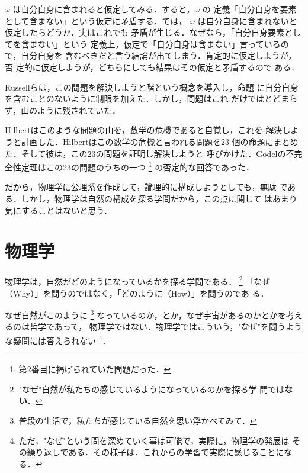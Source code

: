             $\omega$ は自分自身に含まれると仮定してみる．すると，$\omega$ の
            定義「自分自身を要素として含まない」という仮定に矛盾する．では，
            $\omega$ は自分自身に含まれないと仮定したらどうか．実はこれでも
            矛盾が生じる．なぜなら，「自分自身要素としてを含まない」という
            定義上，仮定で「自分自身は含まない」言っているので，自分自身を
            含むべきだと言う結論が出てしまう．肯定的に仮定しようが，否
            定的に仮定しようが，どちらにしても結果はその仮定と矛盾するので
            ある．

            Russellらは，この問題を解決しようと階という概念を導入し，命題
            に自分自身を含むことのないように制限を加えた．しかし，問題はこれ
            だけではとどまらず，山のように残されていた．

            Hilbertはこのような問題の山を，数学の危機であると自覚し，これを
            解決しようと計画した．Hilbertはこの数学の危機と言われる問題を23
            個の命題にまとめた．そして彼は，この23の問題を証明し解決しようと
            呼びかけた．G\"{o}delの不完全性定理はこの23の問題のうちの一つ
                \footnote{
                    第2番目に掲げられていた問題だった．
                }
            の否定的な回答であった．

            だから，物理学に公理系を作成して，論理的に構成しようとしても，無駄
            である．しかし，物理学は自然の構成を探る学問だから，この点に関して
            はあまり気にすることはないと思う．


        \section{物理学}
            物理学は，自然がどのようになっているかを探る学問である．
                \footnote{
                    "なぜ"自然が私たちの感じているようになっているのかを探る学
                    問では\textbf{ない}．
                }
            「なぜ（Why）」を問うのではなく，「どのように（How）」を問うのであ
            る．

            なぜ自然がこのように
                \footnote{
                    普段の生活で，私たちが感じている自然を思い浮かべてみて．
                }
            なっているのか，とか，なぜ宇宙があるのかとかを考えるのは哲学であって，
            物理学ではない．物理学ではこういう，"なぜ"を問うような疑問には答えられない
                \footnote{
                    ただ，"なぜ"という問を深めていく事は可能で，実際に，物理学の発展は
                    その繰り返しである．その様子は．これからの学習で実際に感じることになる．
                }．

